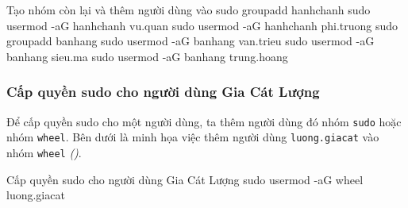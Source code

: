 \vspace{0.5cm}
\begin{bashlisting}{Tạo nhóm còn lại và thêm người dùng vào}
  sudo groupadd hanhchanh
  sudo usermod -aG hanhchanh vu.quan
  sudo usermod -aG hanhchanh phi.truong
  sudo groupadd banhang
  sudo usermod -aG banhang van.trieu
  sudo usermod -aG banhang sieu.ma
  sudo usermod -aG banhang trung.hoang
\end{bashlisting}


\subsubsection{Cấp quyền sudo cho người dùng Gia Cát Lượng}

Để cấp quyền sudo cho một người dùng, ta thêm người dùng đó nhóm \texttt{sudo} hoặc nhóm
\texttt{wheel}. Bên dưới là minh họa việc thêm người dùng \texttt{luong.giacat} vào nhóm
\texttt{wheel} \textit{()}.


\vspace{0.5cm}
\begin{bashlisting}{Cấp quyền sudo cho người dùng Gia Cát Lượng}
  sudo usermod -aG wheel luong.giacat
\end{bashlisting}
